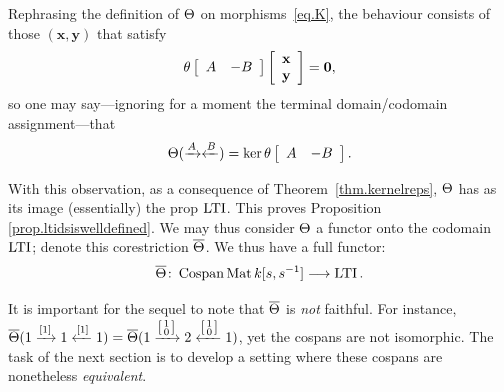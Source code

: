 
Rephrasing the definition of $\Theta$ on morphisms~\eqref{eq.K}, the
behaviour consists of those $(\mathbf{x},\mathbf{y})$ that satisfy
\[
  \theta\left[\begin{array}{cc} A & -B\end{array}\right]
  \left[\begin{array}{c}\mathbf{x}\\\mathbf{y}\end{array}\right] 
  = \mathbf{0},
\]
so one may say---ignoring for a moment the terminal domain/codomain assignment---that 
\[ 
  \Theta (\xrightarrow{A}\xleftarrow{B}) = \ker \theta\left[
  \begin{array}{cc} A & -B\end{array}\right].
\]

With this observation, as a consequence of Theorem~\ref{thm.kernelreps},
$\Theta$ has as its image (essentially) the prop $\operatorname{\mathrm{LTI}}$. This proves
Proposition \ref{prop.ltidsiswelldefined}. We may thus consider $\Theta$ a
functor onto the codomain $\operatorname{\mathrm{LTI}}$; denote this corestriction $\overline{\Theta}$. We thus have a full functor:
\[
  \overline{\Theta} {\colon} \operatorname{{Cospan}}\operatorname{\mathrm{Mat}}{k[s,s^{-1}]} \longrightarrow \operatorname{\mathrm{LTI}}.
\]

\begin{remark}\label{rmk:faithfulness}
It is important for the sequel to note that $\overline{\Theta}$ is \emph{not} faithful.
For instance, $\overline{\Theta}(1\xrightarrow{[1]}1\xleftarrow{[1]}1) =
\overline{\Theta}(1\xrightarrow{ \left[\begin{smallmatrix} 1\\ 0\end{smallmatrix}\right]
}2 \xleftarrow{ \left[\begin{smallmatrix} 1\\ 0\end{smallmatrix}\right]} 1)$, yet
the cospans are not isomorphic. The task of the next section is to develop a
setting where these cospans are nonetheless \emph{equivalent}.
\end{remark}

